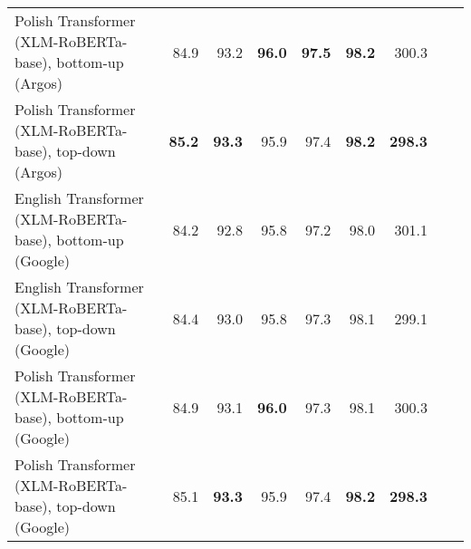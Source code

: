 \begin{table}[ht!]
{\begin{tabular}{lrrrrrrrr}
  Polish Transformer (XLM-RoBERTa-base), bottom-up (Argos) & 84.9 & 93.2 & \textbf{96.0} & \textbf{97.5} & \textbf{98.2} & 300.3 \\ 
  Polish Transformer (XLM-RoBERTa-base), top-down (Argos) & \textbf{85.2} & \textbf{93.3} & 95.9 & 97.4 & \textbf{98.2} & \textbf{298.3} \\ 
  English Transformer (XLM-RoBERTa-base), bottom-up (Google) & 84.2 & 92.8 & 95.8 & 97.2 & 98.0 & 301.1 \\ 
  English Transformer (XLM-RoBERTa-base), top-down (Google) & 84.4 & 93.0 & 95.8 & 97.3 & 98.1 & 299.1 \\ 
  Polish Transformer (XLM-RoBERTa-base), bottom-up (Google) & 84.9 & 93.1 & \textbf{96.0} & 97.3 & 98.1 & 300.3 \\ 
  Polish Transformer (XLM-RoBERTa-base), top-down (Google) & 85.1 & \textbf{93.3} & 95.9 & 97.4 & \textbf{98.2} & \textbf{298.3} \\ 
   \hline
\end{tabular}
}
\end{table}




